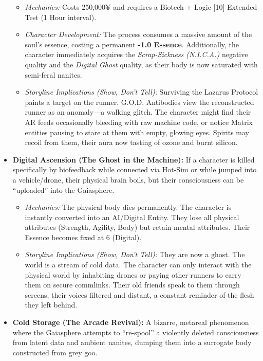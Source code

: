 \documentclass[
  oneside]{article}
\providecommand{\tightlist}{%
  \setlength{\itemsep}{0pt}\setlength{\parskip}{0pt}}
\begin{document}
\begin{multicols}{2}
\begin{itemize}
  \begin{itemize}
  \tightlist
  \item
    \emph{Mechanics:} Costs 250,000¥ and requires
    a Biotech + Logic {[}10{]} Extended Test (1
    Hour interval).
  \item
    \emph{Character Development:} The process
    consumes a massive amount of the soul's
    essence, costing a permanent \textbf{-1.0
    Essence}. Additionally, the character
    immediately acquires the \emph{Scrap-Sickness
    (N.I.C.A.)} negative quality and the
    \emph{Digital Ghost} quality, as their body is
    now saturated with semi-feral nanites.
  \item
    \emph{Storyline Implications (Show, Don't
    Tell):} Surviving the Lazarus Protocol paints
    a target on the runner. G.O.D. Antibodies view
    the reconstructed runner as an anomaly---a
    walking glitch. The character might find their
    AR feeds occasionally bleeding with raw
    machine code, or notice Matrix entities
    pausing to stare at them with empty, glowing
    eyes. Spirits may recoil from them, their aura
    now tasting of ozone and burnt silicon.
  \end{itemize}
\item
  \textbf{Digital Ascension (The Ghost in the
  Machine):} If a character is killed specifically
  by biofeedback while connected via Hot-Sim or
  while jumped into a vehicle/drone, their
  physical brain boils, but their consciousness
  can be ``uploaded'' into the Gaiasphere.

  \begin{itemize}
  \tightlist
  \item
    \emph{Mechanics:} The physical body dies
    permanently. The character is instantly
    converted into an AI/Digital Entity. They lose
    all physical attributes (Strength, Agility,
    Body) but retain mental attributes. Their
    Essence becomes fixed at 6 (Digital).
  \item
    \emph{Storyline Implications (Show, Don't
    Tell):} They are now a ghost. The world is a
    stream of cold data. The character can only
    interact with the physical world by inhabiting
    drones or paying other runners to carry them
    on secure commlinks. Their old friends speak
    to them through screens, their voices filtered
    and distant, a constant reminder of the flesh
    they left behind.
  \end{itemize}
\item
  \textbf{Cold Storage (The Arcade Revival):} A
  bizarre, metareal phenomenon where the
  Gaiasphere attempts to ``re-spool'' a violently
  deleted consciousness from latent data and
  ambient nanites, dumping them into a surrogate
  body constructed from grey goo.


\end{itemize}
\end{multicols}
\end{document}
